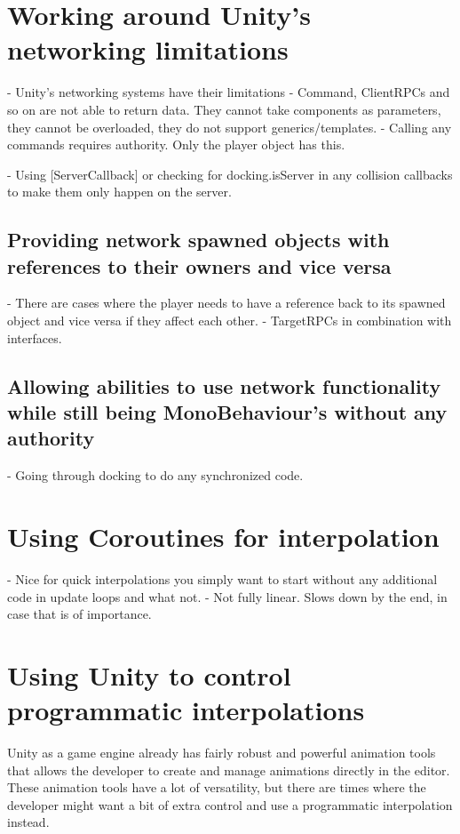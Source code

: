 \section{Working around Unity's networking limitations}
    - Unity's networking systems have their limitations
    - Command, ClientRPCs and so on are not able to return data. They cannot take components as parameters, they cannot be overloaded, they do not support generics/templates.
    - Calling any commands requires authority. Only the player object has this. 
    
    - Using [ServerCallback] or checking for docking.isServer in any collision callbacks to make them only happen on the server. 

\subsection{Providing network spawned objects with references to their owners and vice versa}
    - There are cases where the player needs to have a reference back to its spawned object and vice versa if they affect each other. 
    - TargetRPCs in combination with interfaces. 

\subsection{Allowing abilities to use network functionality while still being MonoBehaviour's without any authority}
    - Going through docking to do any synchronized code. 

\section{Using Coroutines for interpolation}
    - Nice for quick interpolations you simply want to start without any additional code in update loops and what not. 
    - Not fully linear. Slows down by the end, in case that is of importance. 

\section{Using Unity to control programmatic interpolations}
\label{sec:boomerangCurve}
Unity as a game engine already has fairly robust and powerful animation tools that allows the developer to create and manage animations directly in the editor. These animation tools have a lot of versatility, but there are times where the developer might want a bit of extra control and use a programmatic interpolation instead. 

